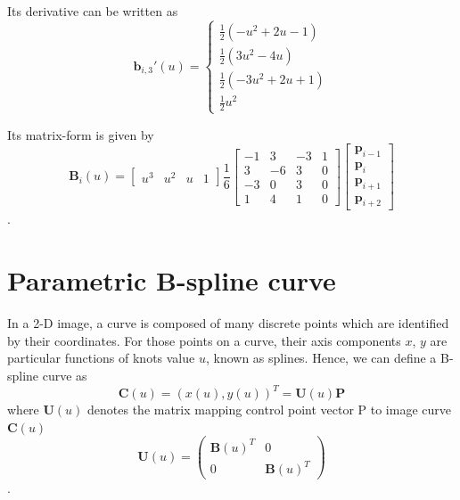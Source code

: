 Its derivative can be written as
\begin{equation}
  \label{eq:4.7}
  \mathbf{b}_{i,3}'(u) = \begin{cases} \frac{1}{2}(-u^2+2u-1) \\
    \frac{1}{2}(3u^2 -4u)\\ \frac{1}{2}(-3u^2+2u+1) \\
    \frac{1}{2}u^2
   \end{cases}
\end{equation}


Its matrix-form is given by
\begin{equation}
  \label{eq:4.8}
\mathbf{B}_i(u) = \begin{bmatrix} u^3 & u^2 & u & 1 \end{bmatrix} \frac{1}{6} \begin{bmatrix}
-1 &  3 & -3 & 1 \\
 3 & -6 &  3 & 0 \\
-3 &  0 &  3 & 0 \\
 1 &  4 &  1 & 0 \end{bmatrix}
\begin{bmatrix} \mathbf{p}_{i-1} \\ \mathbf{p}_{i} \\ \mathbf{p}_{i+1} \\ \mathbf{p}_{i+2} \end{bmatrix}
\end{equation}.

\section{Parametric B-spline curve}
\label{sec:pbc}

In a 2-D image, a curve is composed of many discrete points which are
identified by their coordinates. For those points on a curve, their axis
components $x$, $y$ are particular functions of knots value $u$, known
as splines. Hence, we can define a B-spline curve as 
\begin{equation}
  \label{eq:4.11}
  \mathbf{C}(u) = (x(u),y(u))^T = \mathbf{U}(u) \mathbf{P}
\end{equation}
where $\mathbf{U}(u)$ denotes the matrix mapping control point vector P to image
curve $\mathbf{C}(u)$
\begin{equation}
  \label{eq:4.12}
  \mathbf{U}(u) =   \begin{pmatrix}
\mathbf{B}(u)^T & 0 \\
0 &\mathbf{B}(u)^T
  \end{pmatrix}
\end{equation}.

